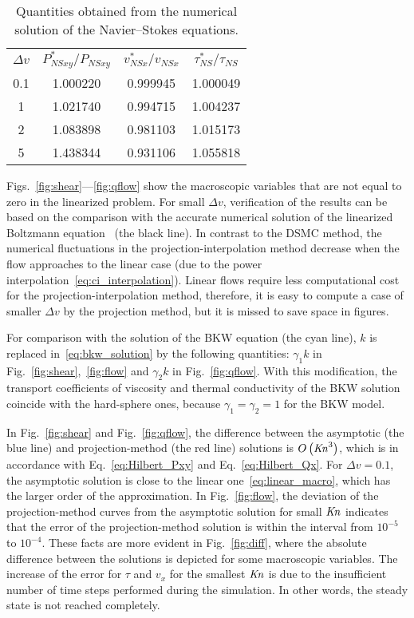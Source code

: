 \documentclass[review]{elsarticle}
\newcommand{\Kn}{\mbox{\textit{Kn}}}
\newcommand{\NS}{N\!S}
\newcommand{\OO}[1]{O\left(#1\right)}
\begin{document}
\begin{table}
    \centering
    \begin{tabular}{cccc}
        \(\Delta{v}\) & \(\displaystyle P_{\NS xy}^*/P_{\NS xy}\) & \(\displaystyle v_{\NS x}^*/v_{\NS x}\) & \(\displaystyle \tau_{\NS}^*/\tau_{\NS}\) \\[3pt]
        0.1 & 1.000220 & 0.999945 & 1.000049 \\
          1 & 1.021740 & 0.994715 & 1.004237 \\
          2 & 1.083898 & 0.981103 & 1.015173 \\
          5 & 1.438344 & 0.931106 & 1.055818 \\
    \end{tabular}
    \caption{Quantities obtained from the numerical solution of the Navier--Stokes equations.}
    \label{table:NS_params}
\end{table}

Figs.~\ref{fig:shear}---\ref{fig:qflow} show the macroscopic variables
that are not equal to zero in the linearized problem.
For small \(\Delta{v}\), verification of the results can be based
on the comparison with the accurate numerical solution of
the linearized Boltzmann equation~\citep{Ohwada1990} (the black line).
In contrast to the DSMC method, the numerical fluctuations in the projection-interpolation method
decrease when the flow approaches to the linear case (due to the power interpolation~\eqref{eq:ci_interpolation}).
Linear flows require less computational cost for the projection-interpolation method,
therefore, it is easy to compute a case of smaller \(\Delta{v}\) by the projection method,
but it is missed to save space in figures.

For comparison with the solution of the BKW equation (the cyan line),
\(k\) is replaced in~\eqref{eq:bkw_solution} by the following quantities:
\(\gamma_1k\) in Fig.~\ref{fig:shear},~\ref{fig:flow} and \(\gamma_2k\) in Fig.~\ref{fig:qflow}.
With this modification, the transport coefficients of viscosity and thermal conductivity
of the BKW solution coincide with the hard-sphere ones, because \(\gamma_1=\gamma_2=1\) for the BKW model.

In Fig.~\ref{fig:shear} and Fig.~\ref{fig:qflow}, the difference between the asymptotic (the blue line)
and projection-method (the red line) solutions is \(\OO{\Kn^3}\),
which is in accordance with Eq.~\eqref{eq:Hilbert_Pxy} and Eq.~\eqref{eq:Hilbert_Qx}.
For \(\Delta{v}=0.1\), the asymptotic solution is close to the linear one~\eqref{eq:linear_macro},
which has the larger order of the approximation.
In Fig.~\ref{fig:flow}, the deviation of the projection-method curves
from the asymptotic solution for small \(\Kn\) indicates that
the error of the projection-method solution is within the interval from \(10^{-5}\) to \(10^{-4}\).
These facts are more evident in Fig.~\ref{fig:diff},
where the absolute difference between the solutions
is depicted for some macroscopic variables.
The increase of the error for \(\tau\) and \(v_x\) for the smallest \(\Kn\)
is due to the insufficient number of time steps performed during the simulation.
In other words, the steady state is not reached completely.
\end{document}
